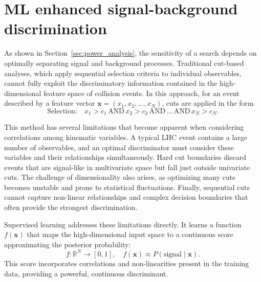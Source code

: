 \section{ML enhanced signal-background discrimination}
\label{sec:machine_learning}

As shown in Section~\ref{sec:power_analysis}, the sensitivity of a search depends on optimally separating signal and background processes. Traditional cut-based analyses, which apply sequential selection criteria to individual observables, cannot fully exploit the discriminatory information contained in the high-dimensional feature space of collision events. In this approach, for an event described by a feature vector $\mathbf{x} = (x_1, x_2, \ldots, x_N)$, cuts are applied in the form
\begin{equation}
\text{Selection:} \quad x_1 > c_1 \,\text{AND}\, x_2 > c_2 \,\text{AND}\, \ldots \,\text{AND}\, x_N > c_N.
\end{equation}

This method has several limitations that become apparent when considering correlations among kinematic variables. A typical LHC event contains a large number of observables, and an optimal discriminator must consider these variables and their relationships simultaneously. Hard cut boundaries discard events that are signal-like in multivariate space but fall just outside univariate cuts. The challenge of dimensionality also arises, as optimizing many cuts becomes unstable and prone to statistical fluctuations. Finally, sequential cuts cannot capture non-linear relationships and complex decision boundaries that often provide the strongest discrimination.

Supervised learning addresses these limitations directly. It learns a function $f(\mathbf{x})$ that maps the high-dimensional input space to a continuous score approximating the posterior probability:
\begin{equation}
f: \mathbb{R}^N \rightarrow [0,1], \quad f(\mathbf{x}) \approx P(\text{signal} \mid \mathbf{x}).
\end{equation}
This score incorporates correlations and non-linearities present in the training data, providing a powerful, continuous discriminant.

